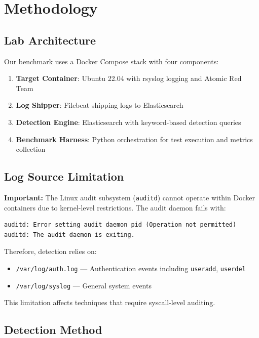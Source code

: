 \documentclass[11pt,a4paper]{article}
\begin{document}
\section{Methodology}

\subsection{Lab Architecture}

Our benchmark uses a Docker Compose stack with four components:

\begin{enumerate}
    \item \textbf{Target Container}: Ubuntu 22.04 with rsyslog logging and Atomic Red Team
    \item \textbf{Log Shipper}: Filebeat shipping logs to Elasticsearch
    \item \textbf{Detection Engine}: Elasticsearch with keyword-based detection queries
    \item \textbf{Benchmark Harness}: Python orchestration for test execution and metrics collection
\end{enumerate}

\subsection{Log Source Limitation}

\textbf{Important:} The Linux audit subsystem (\texttt{auditd}) cannot operate within Docker containers due to kernel-level restrictions. The audit daemon fails with:

\begin{verbatim}
auditd: Error setting audit daemon pid (Operation not permitted)
auditd: The audit daemon is exiting.
\end{verbatim}

Therefore, detection relies on:
\begin{itemize}
    \item \texttt{/var/log/auth.log} --- Authentication events including \texttt{useradd}, \texttt{userdel}
    \item \texttt{/var/log/syslog} --- General system events
\end{itemize}

This limitation affects techniques that require syscall-level auditing.

\subsection{Detection Method}
\end{document}
